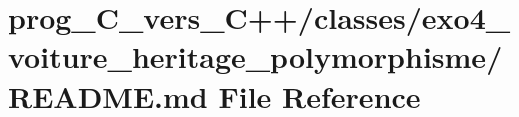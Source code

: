 \hypertarget{prog__C__vers__C_09_09_2classes_2exo4__voiture__heritage__polymorphisme_2README_8md}{}\section{prog\+\_\+\+C\+\_\+vers\+\_\+\+C++/classes/exo4\+\_\+voiture\+\_\+heritage\+\_\+polymorphisme/\+R\+E\+A\+D\+ME.md File Reference}
\label{prog__C__vers__C_09_09_2classes_2exo4__voiture__heritage__polymorphisme_2README_8md}
